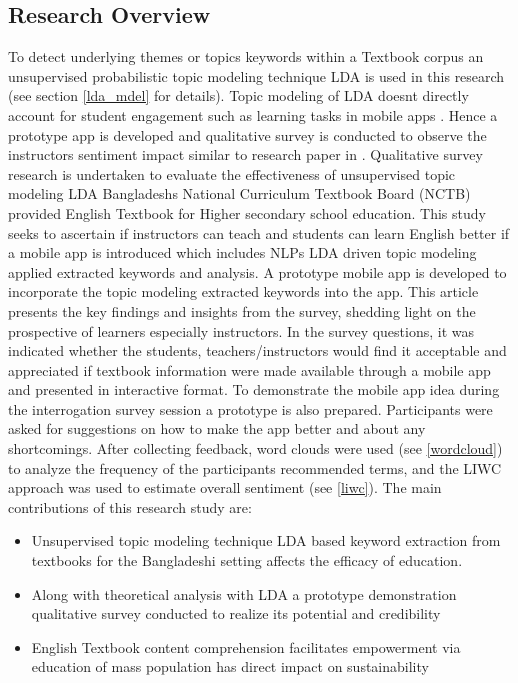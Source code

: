 \documentclass[sn-mathphys,Numbered]{sn-jnl}%
\theoremstyle{thmstyleone}%
\theoremstyle{thmstyletwo}%
\theoremstyle{thmstylethree}%
\begin{document}
\subsection{Research Overview} 
To detect underlying themes or topics keywords within a Textbook corpus an unsupervised probabilistic topic modeling technique LDA is used in this research \cite{jelodar_latent_2019} (see section \ref{lda_mdel} for details). Topic modeling of LDA doesn\textquotesingle t directly account for student engagement such as learning tasks in mobile apps \cite{sandberg_mobile_2011}. Hence a prototype app is developed and qualitative survey is conducted to observe the instructor\textquotesingle s sentiment impact similar to research paper in \cite{oz2015investigation}. Qualitative survey research is undertaken to evaluate the effectiveness of unsupervised topic modeling LDA Bangladesh\textquotesingle s National Curriculum Textbook Board (NCTB) provided English Textbook for Higher secondary school education. This study seeks to ascertain if instructors can teach and students can learn English better if a mobile app is introduced which includes NLP\textquotesingle s LDA driven topic modeling applied extracted keywords and analysis. A prototype mobile app is developed to incorporate the topic modeling extracted keywords into the app. This article presents the key findings and insights from the survey, shedding light on the prospective of learners especially instructors. In the survey questions, it was indicated whether the students, teachers/instructors would find it acceptable and appreciated if textbook information were made available through a mobile app and presented in interactive format. To demonstrate the mobile app idea during the interrogation survey session a prototype is also prepared. Participants were asked for suggestions on how to make the app better and about any shortcomings. After collecting feedback, word clouds were used (see \ref{wordcloud}) to analyze the frequency of the participants\textquotesingle{} recommended terms, and the LIWC approach was used to estimate overall sentiment (see \ref{liwc}). The main contributions of this research study are:
\begin{itemize}
\item Unsupervised topic modeling technique LDA based keyword extraction from textbooks for the Bangladeshi setting affects the efficacy of education.
\item Along with theoretical analysis with LDA a prototype demonstration qualitative survey conducted to realize its potential and credibility
\item English Textbook content comprehension facilitates empowerment via education of mass population has direct impact on sustainability
\end{itemize}
\end{document}
